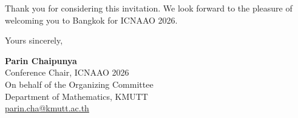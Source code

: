\documentclass[a4paper,11pt]{article}
\makeatletter
\newcommand{\SignatoryName}{Parin Chaipunya}
\newcommand{\SignatoryTitle}{Conference Chair, ICNAAO 2026}
\newcommand{\SignatoryEmail}{parin.cha@kmutt.ac.th}
\makeatother
\begin{document}
Thank you for considering this invitation. We look forward to the pleasure
of welcoming you to Bangkok for ICNAAO 2026.

Yours sincerely,

\vspace{12mm} %
\textbf{\SignatoryName}\\
\SignatoryTitle\\
On behalf of the Organizing Committee\\
Department of Mathematics, KMUTT\\
\href{mailto:\SignatoryEmail}{\SignatoryEmail}
\end{document}

